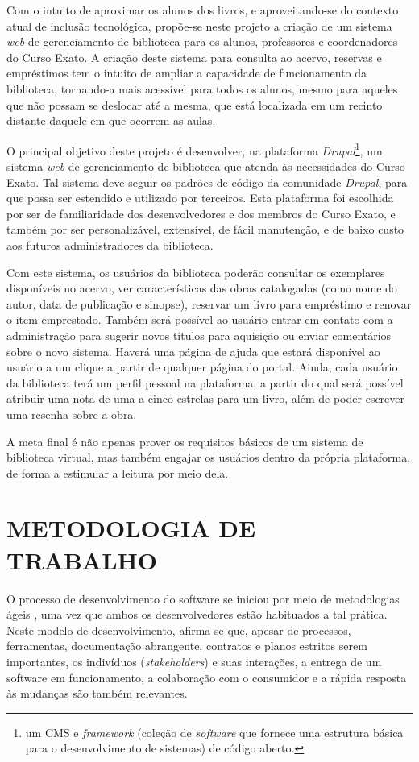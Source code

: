 \documentclass[a4paper]{article}
\begin{document}
Com o intuito de aproximar os alunos dos livros, e aproveitando-se do contexto atual de inclusão tecnológica, propõe-se neste projeto a criação de um sistema \textit{web} de gerenciamento de biblioteca para os alunos, professores e coordenadores do Curso Exato. A criação deste sistema para consulta ao acervo, reservas e empréstimos tem o intuito de ampliar a capacidade de funcionamento da biblioteca, tornando-a mais acessível para todos os alunos, mesmo para aqueles que não possam se deslocar até a mesma, que está localizada em um recinto distante daquele em que ocorrem as aulas.

O principal objetivo deste projeto é desenvolver, na plataforma \textit{Drupal}\footnote{um CMS e \textit{framework} (coleção de \textit{software} que fornece uma estrutura básica para o desenvolvimento de sistemas) de código aberto.}, um sistema \textit{web} de gerenciamento de biblioteca que atenda às necessidades do Curso Exato. Tal sistema deve seguir os padrões de código da comunidade \textit{Drupal}, para que possa ser estendido e utilizado por terceiros. Esta plataforma foi escolhida por ser de familiaridade dos desenvolvedores e dos membros do Curso Exato, e também por ser personalizável, extensível, de fácil manutenção, e de baixo custo aos futuros administradores da biblioteca.

Com este sistema, os usuários da biblioteca poderão consultar os exemplares disponíveis no acervo, ver características das obras catalogadas (como nome do autor, data de publicação e sinopse), reservar um livro para empréstimo e renovar o item emprestado. Também será possível ao usuário entrar em contato com a administração para sugerir novos títulos para aquisição ou enviar comentários sobre o novo sistema. Haverá uma página de ajuda que estará disponível ao usuário a um clique a partir de qualquer página do portal. Ainda, cada usuário da biblioteca terá um perfil pessoal na plataforma, a partir do qual será possível atribuir uma nota de uma a cinco estrelas para um livro, além de poder escrever uma resenha sobre a obra.

A meta final é não apenas prover os requisitos básicos de um sistema de biblioteca virtual, mas também engajar os usuários dentro da própria plataforma, de forma a estimular a leitura por meio dela.


\pagebreak
\section{METODOLOGIA DE TRABALHO}
O processo de desenvolvimento do software se iniciou por meio de metodologias ágeis \cite{manifesto}, uma vez que ambos os desenvolvedores estão habituados a tal prática. Neste modelo de desenvolvimento, afirma-se que, apesar de processos, ferramentas, documentação abrangente, contratos e planos estritos serem importantes, os indivíduos (\textit{stakeholders}) e suas interações, a entrega de um software em funcionamento, a colaboração com o consumidor e a rápida resposta às mudanças são também relevantes.
\end{document}
